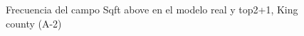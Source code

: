 \begin{figure}[H]
    \centering
    
    \caption{Frecuencia del campo Sqft above en el modelo real y top2+1, King county (A-2)}
    \label{frecuency-top2+1-sqft above}
\end{figure}